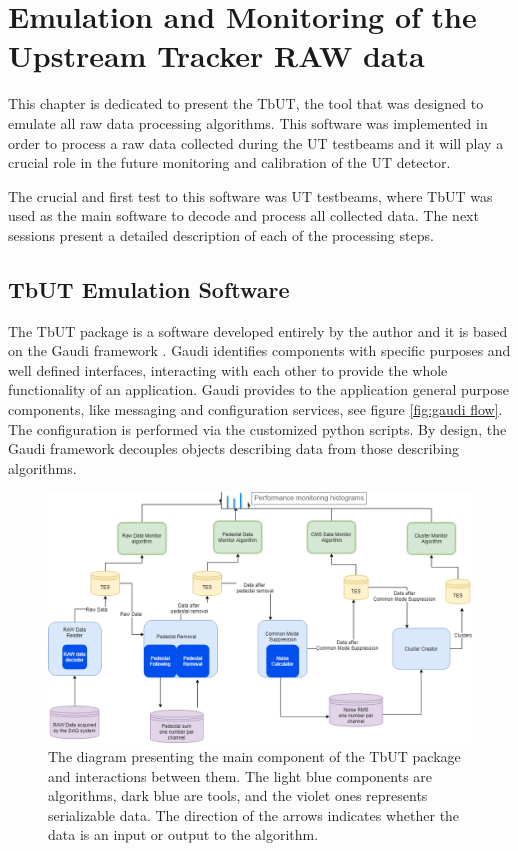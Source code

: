\chapter{Emulation and Monitoring of the Upstream Tracker RAW data}

This chapter is dedicated to present the TbUT, the tool that was designed to emulate all raw data processing algorithms. This software was implemented in order to process a raw data collected during the UT testbeams and it will play a crucial role in the future monitoring and calibration of the UT detector. 

The crucial and first test to this software was UT testbeams, where TbUT was used as the main software to decode and process all collected data. The next sessions present a detailed description of each of the processing steps.


\section{TbUT Emulation Software}
\label{chapter:tbut}
The TbUT package is a software developed entirely by the author and it is based on the Gaudi framework \cite{Gaudi}. Gaudi identifies components with specific purposes and well defined interfaces, interacting with each other to provide the whole functionality of an application. Gaudi provides to the application general purpose components, like messaging and configuration services, see figure \ref{fig:gaudi flow}. The configuration is performed via the customized python scripts. By design, the Gaudi framework decouples objects describing data from those describing algorithms.



\begin{figure}[h]
\centering
\includegraphics{figures/TBUT.png}
\caption{The diagram presenting the main component of the TbUT package and interactions between them. The light blue components are algorithms, dark blue are tools, and the violet ones represents serializable data. The direction of the arrows indicates whether the data is an input or output to the algorithm. }
\label{fig:TbUT}
\end{figure}

